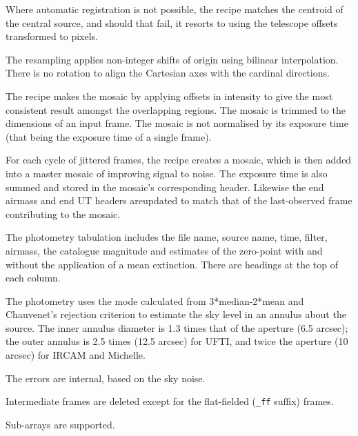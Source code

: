 \documentclass[twoside,11pt,nolof]{starlink}
\begin{document}
{{{         \sstitem
         Where automatic registration is not possible, the recipe matches
         the centroid of the central source, and should that fail, it resorts
         to using the telescope offsets transformed to pixels.

         \sstitem
         The resampling applies non-integer shifts of origin using
         bilinear interpolation.  There is no rotation to align the
         Cartesian axes with the cardinal directions.

         \sstitem
         The recipe makes the mosaic by applying offsets in intensity to
         give the most consistent result amongst the overlapping regions.
         The mosaic is trimmed to the dimensions of an input frame.  The
         mosaic is not normalised by its exposure time (that being the
         exposure time of a single frame).

         \sstitem
         For each cycle of jittered frames, the recipe creates a mosaic,
         which is then added into a master mosaic of improving signal to
         noise.  The exposure time is also summed and stored in the mosaic's
         corresponding header.  Likewise the end airmass and end UT headers
         areupdated to match that of the last-observed frame contributing
         to the mosaic.

         \sstitem
         The photometry tabulation includes the file name, source name, time,
         filter, airmass, the catalogue magnitude and estimates of the
         zero-point with and without the application of a mean extinction.
         There are headings at the top of each column.

         \sstitem
         The photometry uses the mode calculated from 3*median-2*mean
         and Chauvenet's rejection criterion to estimate the sky level in an
         annulus about the source. The inner annulus diameter is 1.3 times
         that of the aperture (6.5 arcsec); the outer annulus is 2.5 times
         (12.5 arcsec) for UFTI, and twice the aperture (10 arcsec) for IRCAM
         and Michelle.

         The errors are internal, based on the sky noise.

         \sstitem
         Intermediate frames are deleted except for the flat-fielded ({\tt\_ff}
         suffix) frames.

         \sstitem
         Sub-arrays are supported.
      }
   }
   }
\end{document}
